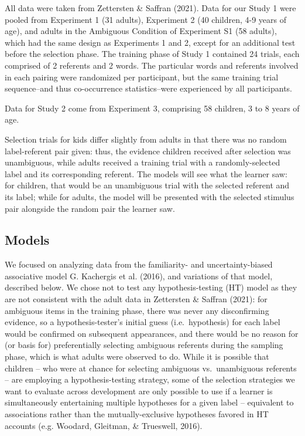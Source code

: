 \documentclass[10pt, letterpaper]{article}
\begin{document}
All data were taken from Zettersten \& Saffran (2021). Data for our
Study 1 were pooled from Experiment 1 (31 adults), Experiment 2 (40
children, 4-9 years of age), and adults in the Ambiguous Condition of
Experiment S1 (58 adults), which had the same design as Experiments 1
and 2, except for an additional test before the selection phase. The
training phase of Study 1 contained 24 trials, each comprised of 2
referents and 2 words. The particular words and referents involved in
each pairing were randomized per participant, but the same training
trial sequence--and thus co-occurrence statistics--were experienced by
all participants.

Data for Study 2 come from Experiment 3, comprising 58 children, 3 to 8
years of age.

Selection trials for kids differ slightly from adults in that there was
no random label-referent pair given: thus, the evidence children
received after selection was unambiguous, while adults received a
training trial with a randomly-selected label and its corresponding
referent. The models will see what the learner saw: for children, that
would be an unambiguous trial with the selected referent and its label;
while for adults, the model will be presented with the selected stimulus
pair alongside the random pair the learner saw.

\subsection{Models}\label{models}

We focused on analyzing data from the familiarity- and
uncertainty-biased associative model G. Kachergis et al. (2016), and
variations of that model, described below. We chose not to test any
hypothesis-testing (HT) model as they are not consistent with the adult
data in Zettersten \& Saffran (2021): for ambiguous items in the
training phase, there was never any disconfirming evidence, so a
hypothesis-tester's initial guess (i.e.~hypothesis) for each label would
be confirmed on subsequent appearances, and there would be no reason for
(or basis for) preferentially selecting ambiguous referents during the
sampling phase, which is what adults were observed to do. While it is
possible that children -- who were at chance for selecting ambiguous
vs.~unambiguous referents -- are employing a hypothesis-testing
strategy, some of the selection strategies we want to evaluate across
development are only possible to use if a learner is simultaneously
entertaining multiple hypotheses for a given label -- equivalent to
associations rather than the mutually-exclusive hypotheses favored in HT
accounts (e.g. Woodard, Gleitman, \& Trueswell, 2016).
\end{document}
